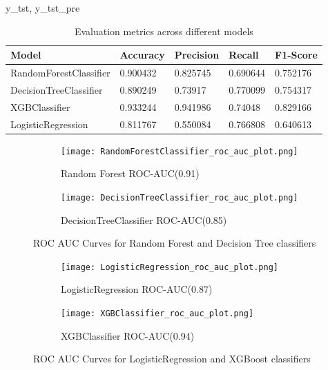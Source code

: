 y_tst, y_tst_pre\documentclass[12pt]{article}
\begin{document}
\begin{table}[!ht]
    \centering
    \begin{tabular}{|l|l|l|l|l|}
    \hline
        Model & Accuracy & Precision & Recall & F1-Score \\ \hline
        RandomForestClassifier & 0.900432 & 0.825745 & 0.690644 & 0.752176 \\ \hline
        DecisionTreeClassifier & 0.890249 & 0.73917 & 0.770099 & 0.754317 \\ \hline
        XGBClassifier & 0.933244 & 0.941986 & 0.74048 & 0.829166 \\ \hline
        LogisticRegression & 0.811767 & 0.550084 & 0.766808 & 0.640613 \\ \hline
    \end{tabular}
    \caption{Evaluation metrics across different models}
\end{table}


\begin{figure}[!htb]
     \centering
     \begin{subfigure}[b]{0.3\textwidth}
         \centering
         \texttt{[image: RandomForestClassifier\_roc\_auc\_plot.png]}
         \caption{Random Forest ROC-AUC(0.91)}
         \label{fig:RF}
     \end{subfigure}
     \hfill
     \begin{subfigure}[b]{0.3\textwidth}
         \centering
         \texttt{[image: DecisionTreeClassifier\_roc\_auc\_plot.png]}
         \caption{DecisionTreeClassifier ROC-AUC(0.85)}
         \label{fig:DT}
     \end{subfigure}
     \hfill
        \caption{ROC AUC Curves for Random Forest and Decision Tree classifiers}
        \label{fig:ROC AUC}
\end{figure}

\begin{figure}[!htb]
     \centering
     \begin{subfigure}[b]{0.3\textwidth}
         \centering
         \texttt{[image: LogisticRegression\_roc\_auc\_plot.png]}
         \caption{LogisticRegression ROC-AUC(0.87)}
         \label{fig:DT}
     \end{subfigure}
     \hfill
     \begin{subfigure}[b]{0.3\textwidth}
         \centering
         \texttt{[image: XGBClassifier\_roc\_auc\_plot.png]}
         \caption{XGBClassifier ROC-AUC(0.94)}
         \label{fig:XGB}
     \end{subfigure}
        \caption{ROC AUC Curves for LogisticRegression and XGBoost classifiers}
        \label{fig:ROC AUC}
\end{figure}
\end{document}
